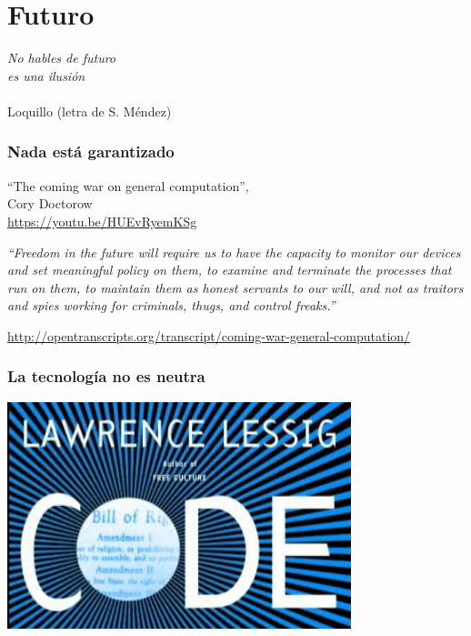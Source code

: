 
\section{Futuro}

\begin{flushright}
{\em
  No hables de futuro \\
  es una ilusión \\
}
~ \\
Loquillo (letra de S. Méndez) \\
\end{flushright}

\begin{frame}[fragile]
  \frametitle{Nada está garantizado}

  ``The coming war on general computation'', \\
  Cory Doctorow \\

  \url{https://youtu.be/HUEvRyemKSg}
\end{frame}

\begin{frame}[fragile]

  {\em
  ``Freedom in the future will require us to have the capac­i­ty to mon­i­tor our devices and set mean­ing­ful pol­i­cy on them, to exam­ine and ter­mi­nate the process­es that run on them, to main­tain them as hon­est ser­vants to our will, and not as trai­tors and spies work­ing for crim­i­nals, thugs, and con­trol freaks.''
  }

  \begin{flushright}
  {\small
    \url{http://opentranscripts.org/transcript/coming-war-general-computation/}
  }
  \end{flushright}
  
\end{frame}

\begin{frame}[fragile]
  \frametitle{La tecnología no es neutra}

  \begin{center}
  \includegraphics[width=10cm]{figs/code-is-law}
  \end{center}

\end{frame}

